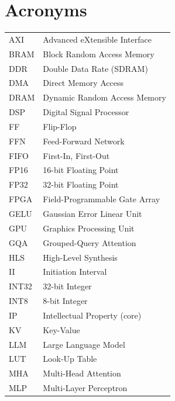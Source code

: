 
\chapter*{Acronyms}

\setlength{\LTleft}{0pt}
\setlength{\LTright}{\fill}
\begin{longtable}{@{}ll}
  AXI     & Advanced eXtensible Interface \\
  BRAM    & Block Random Access Memory \\
  DDR     & Double Data Rate (SDRAM) \\
  DMA     & Direct Memory Access \\
  DRAM    & Dynamic Random Access Memory \\
  DSP     & Digital Signal Processor \\
  FF      & Flip-Flop \\
  FFN     & Feed-Forward Network \\
  FIFO    & First-In, First-Out \\
  FP16    & 16-bit Floating Point \\
  FP32    & 32-bit Floating Point \\
  FPGA    & Field-Programmable Gate Array \\
  GELU    & Gaussian Error Linear Unit \\
  GPU     & Graphics Processing Unit \\
  GQA     & Grouped-Query Attention \\
  HLS     & High-Level Synthesis \\
  II      & Initiation Interval \\
  INT32   & 32-bit Integer \\
  INT8    & 8-bit Integer \\
  IP      & Intellectual Property (core) \\
  KV      & Key-Value \\
  LLM     & Large Language Model \\
  LUT     & Look-Up Table \\
  MHA     & Multi-Head Attention \\
  MLP     & Multi-Layer Perceptron \\

\end{longtable}
